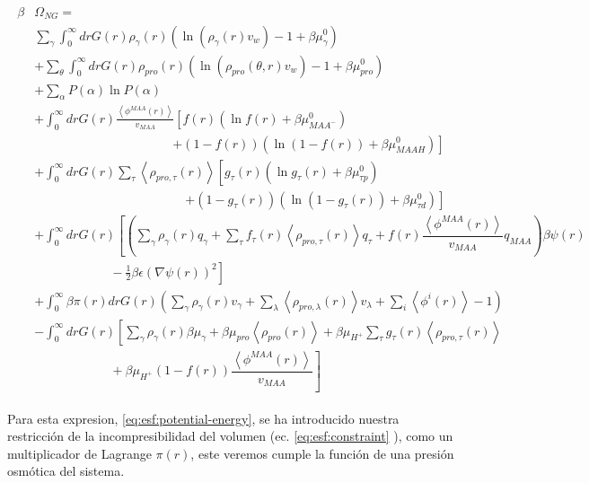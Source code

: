 \begin{align}
	\begin{aligned}
		\beta&\Omega_{NG}=\\&  \sum_{\gamma}\int_0^\infty{dr G(r)\rho_\gamma(r)\left(\ln \left(\rho_\gamma (r)v_w\right) -1 + \beta\mu^0_\gamma\right)} \\
		& +\sum_\theta \int_0^\infty{dr G(r)\rho_{pro}(r)\left(\ln (\rho_{pro}(\theta,r)v_w)-1 + \beta\mu^0_{pro} \right)} \\
		& + \sum_{\alpha}{P(\alpha)\ln P(\alpha)} \\
		& +\int_0^\infty drG(r) \frac{\left<\phi^{MAA}(r)\right>}{v_{MAA}} \left[f(r)(\ln f(r)+ \beta\mu^0_{MAA^-})\right.\\
		&\qquad \qquad \qquad\qquad \qquad \quad \left.+(1-f(r))(\ln (1-f(r))+\beta\mu^0_{MAAH})\right] \\
		& +\int_0^\infty drG(r)\sum_\tau \left<\rho_{pro,\tau}(r)\right> \left[g_\tau(r)(\ln g_\tau(r)+ \beta\mu^0_{\tau p})\right.\\
		&\qquad\qquad \qquad\qquad \qquad \qquad\left.+(1-g_\tau(r))(\ln (1-g_\tau(r))+\beta\mu^0_{\tau d})\right] \\
		& +  \int_0^\infty drG(r)\left[\left(\sum_{\gamma } {\rho_\gamma(r) q_\gamma + \sum_\tau{f_\tau(r) \left<\rho_{pro,\tau}(r)\right> q_\tau} +  f(r)\dfrac{\left<\phi^{MAA}(r)\right>}{v_{MAA}}q_{MAA}}\right)\beta\psi(r) \right.\\  &\left. \hspace{6em}-\frac{1}{2}\beta\epsilon(\nabla\psi(r))^2 \right]\\
		&+ \int_0^\infty \beta\pi(r) drG(r){\left(\sum_{\gamma}\rho_\gamma(r) v_\gamma + \sum_{\lambda}{\left<\rho_{pro,\lambda}(r)\right>}{v_\lambda} + \sum_i\left<\phi^i(r)\right> -1\right)}\\
		& -\int_0^\infty drG(r)\left[\sum_{\gamma }{\rho_\gamma(r)\beta\mu_\gamma}
		+ \beta\mu_{pro} \left<\rho_{pro}(r)\right>
		+\beta\mu_{H^+}\sum_{\tau}{g_\tau(r)\left<\rho_{pro,\tau}(r)\right> } \right.\\
		& \left. \hspace{6em} +\beta\mu_{H^+}(1-f(r))\dfrac{\left<\phi^{MAA}(r)\right>}{v_{MAA}}\right]%
	\end{aligned}
	\label{eq:esf:potential-energy}
\end{align}


Para esta expresion,  \ref{eq:esf:potential-energy}, se ha introducido nuestra restricci\'on de la incompresibilidad del volumen (ec. \ref{eq:esf:constraint} ), como un  multiplicador  de  Lagrange $\pi(r)$, este veremos cumple la funci\'on de una presi\'on osm\'otica del sistema. 

